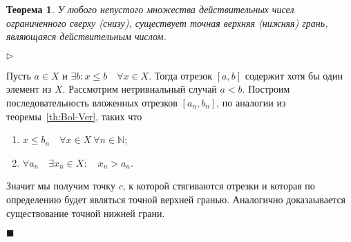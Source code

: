 \documentclass{urticle}
\newtheorem{theorem}{Теорема}
\theoremstyle{definition}
\newcommand{\prf}[1]{\hspace{0.3cm}$\triangleright$ \hspace{0.2cm} {#1} \hfill $\blacksquare$ }
\begin{document}
    \begin{theorem}
    \label{th:ExistSupInf}    
        У любого непустого множества действительных чисел ограниченного сверху (снизу), существует точная верхняя (нижняя) грань, являющаяся действительным числом. 
    \end{theorem}
    \prf{ Пусть $a \in X$ и $\exists b: x \leq b \quad \forall x \in X$. Тогда отрезок $[a, b]$ содержит хотя бы один элемент из $X$. Рассмотрим нетривиальный случай $a<b$. Построим последовательность вложенных отрезков $[a_n, b_n]$, по аналогии из теоремы~\ref{th:Bol-Ver}, таких что 
    \begin{enumerate}
    \item $x \leq b_n \quad \forall x \in X\: \forall n \in \mathbb{N}$;
    \item $\forall a_n \quad \exists x_n \in X: \quad x_n > a_n$.
    \end{enumerate}
    Значит мы получим точку $c$, к которой стягиваются отрезки и которая по определению будет являться точной верхней гранью. Аналогично доказаывается существование точной нижней грани. }
\end{document}
